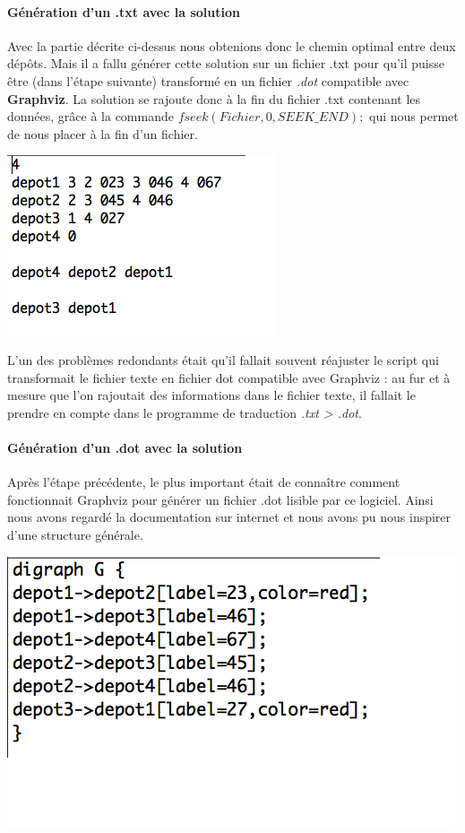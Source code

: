 \documentclass[12pt,a4paper]{report}
\begin{document}
\paragraph{Génération d'un .txt avec la solution}
Avec la partie décrite ci-dessus nous obtenions donc le chemin optimal entre deux dépôts. Mais il a fallu générer cette solution sur un fichier .txt pour qu'il puisse être (dans l'étape suivante) transformé en un fichier \textit{.dot} compatible avec \textbf{Graphviz}. La solution se rajoute donc à la fin du fichier .txt contenant les données, grâce à la commande \textit{$fseek(Fichier, 0, SEEK\_END);$} qui nous permet de nous placer à la fin d'un fichier. 
\begin{center}
\includegraphics[scale=0.5]{capture7.png}
\label{fig4}
\end{center}
L'un des problèmes redondants était qu'il fallait souvent réajuster le script qui transformait le fichier texte en fichier dot compatible avec Graphviz : au fur et à mesure que l'on rajoutait des informations dans le fichier texte, il fallait le prendre en compte dans le programme de traduction \textit{.txt > .dot}.

\paragraph{Génération d'un .dot avec la solution}
Après l'étape précédente, le plus important était de connaître comment fonctionnait Graphviz pour générer un fichier .dot lisible par ce logiciel. Ainsi nous avons regardé la documentation sur internet et nous avons pu nous inspirer d'une structure générale.
\begin{center}
\includegraphics[scale=0.4]{capture3.png}
\label{fig5}
\end{center}
\end{document}
